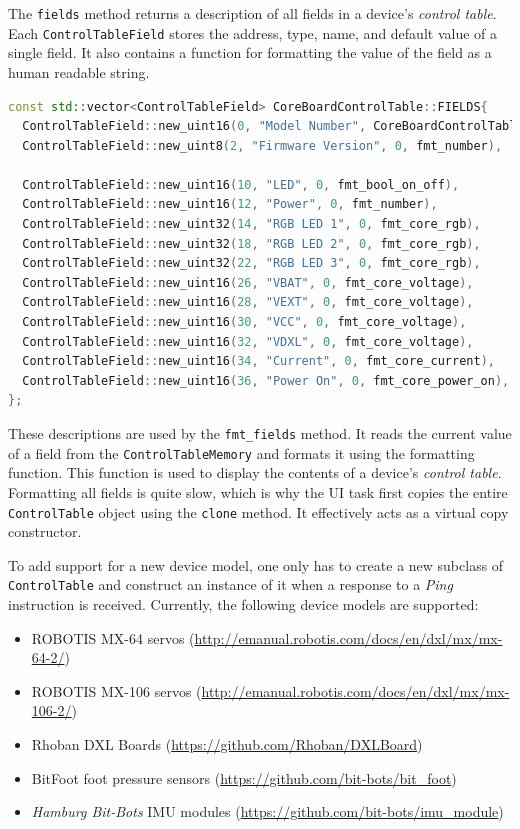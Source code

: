The \lstinline{fields} method returns a description of all fields in a device's \textit{control table}.
Each \lstinline{ControlTableField} stores the address, type, name, and default value of a single
field. It also contains a function for formatting the value of the field as a human readable string.

\begin{lstlisting}[language=C++, caption={Definition of the control table fields of a Rhoban DXL Board}]
const std::vector<ControlTableField> CoreBoardControlTable::FIELDS{
  ControlTableField::new_uint16(0, "Model Number", CoreBoardControlTable::MODEL_NUMBER, fmt_number),
  ControlTableField::new_uint8(2, "Firmware Version", 0, fmt_number),

  ControlTableField::new_uint16(10, "LED", 0, fmt_bool_on_off),
  ControlTableField::new_uint16(12, "Power", 0, fmt_number),
  ControlTableField::new_uint32(14, "RGB LED 1", 0, fmt_core_rgb),
  ControlTableField::new_uint32(18, "RGB LED 2", 0, fmt_core_rgb),
  ControlTableField::new_uint32(22, "RGB LED 3", 0, fmt_core_rgb),
  ControlTableField::new_uint16(26, "VBAT", 0, fmt_core_voltage),
  ControlTableField::new_uint16(28, "VEXT", 0, fmt_core_voltage),
  ControlTableField::new_uint16(30, "VCC", 0, fmt_core_voltage),
  ControlTableField::new_uint16(32, "VDXL", 0, fmt_core_voltage),
  ControlTableField::new_uint16(34, "Current", 0, fmt_core_current),
  ControlTableField::new_uint16(36, "Power On", 0, fmt_core_power_on),
};
\end{lstlisting}

These descriptions are used by the \lstinline{fmt_fields} method. It reads the current value of a
field from the \lstinline{ControlTableMemory} and formats it using the formatting function. This
function is used to display the contents of a device's \textit{control table}. Formatting all fields
is quite slow, which is why the UI task first copies the entire \lstinline{ControlTable} object using
the \lstinline{clone} method. It effectively acts as a virtual copy constructor.

To add support for a new device model, one only has to create a new subclass of \lstinline{ControlTable}
and construct an instance of it when a response to a \textit{Ping} instruction is received. Currently,
the following device models are supported:

\begin{itemize}
    \item ROBOTIS MX-64 servos (\url{http://emanual.robotis.com/docs/en/dxl/mx/mx-64-2/})
    \item ROBOTIS MX-106 servos (\url{http://emanual.robotis.com/docs/en/dxl/mx/mx-106-2/})
    \item Rhoban DXL Boards (\url{https://github.com/Rhoban/DXLBoard})
    \item BitFoot foot pressure sensors (\url{https://github.com/bit-bots/bit_foot})
    \item \textit{Hamburg Bit-Bots} IMU modules (\url{https://github.com/bit-bots/imu_module})
\end{itemize}
